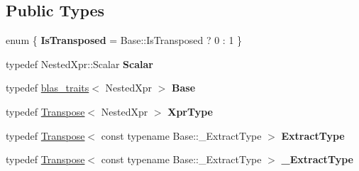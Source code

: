 \subsection*{Public Types}
\begin{DoxyCompactItemize}
\item 
\mbox{\label{struct_eigen_1_1internal_1_1blas__traits_3_01_transpose_3_01_nested_xpr_01_4_01_4_a8b53224e3769a9bff64ad6bf93973b93}} 
enum \{ {\bfseries Is\+Transposed} = Base\+::Is\+Transposed ? 0 \+: 1
 \}
\item 
\mbox{\label{struct_eigen_1_1internal_1_1blas__traits_3_01_transpose_3_01_nested_xpr_01_4_01_4_ab8f56c83a3977445c0f2fe1519ded7ab}} 
typedef Nested\+Xpr\+::\+Scalar {\bfseries Scalar}
\item 
\mbox{\label{struct_eigen_1_1internal_1_1blas__traits_3_01_transpose_3_01_nested_xpr_01_4_01_4_a98ee8e1e8d3feea2c0cc211608853721}} 
typedef \mbox{\hyperlink{struct_eigen_1_1internal_1_1blas__traits}{blas\+\_\+traits}}$<$ Nested\+Xpr $>$ {\bfseries Base}
\item 
\mbox{\label{struct_eigen_1_1internal_1_1blas__traits_3_01_transpose_3_01_nested_xpr_01_4_01_4_a8c6c7c398df3cc58c6326cbaa1e6d486}} 
typedef \mbox{\hyperlink{class_eigen_1_1_transpose}{Transpose}}$<$ Nested\+Xpr $>$ {\bfseries Xpr\+Type}
\item 
\mbox{\label{struct_eigen_1_1internal_1_1blas__traits_3_01_transpose_3_01_nested_xpr_01_4_01_4_adf8c914c5fc4062759771ec13db5e0f5}} 
typedef \mbox{\hyperlink{class_eigen_1_1_transpose}{Transpose}}$<$ const typename Base\+::\+\_\+\+Extract\+Type $>$ {\bfseries Extract\+Type}
\item 
\mbox{\label{struct_eigen_1_1internal_1_1blas__traits_3_01_transpose_3_01_nested_xpr_01_4_01_4_ad3c53fc92612e717eb957593716a41a8}} 
typedef \mbox{\hyperlink{class_eigen_1_1_transpose}{Transpose}}$<$ const typename Base\+::\+\_\+\+Extract\+Type $>$ {\bfseries \+\_\+\+Extract\+Type}

\end{DoxyCompactItemize}
